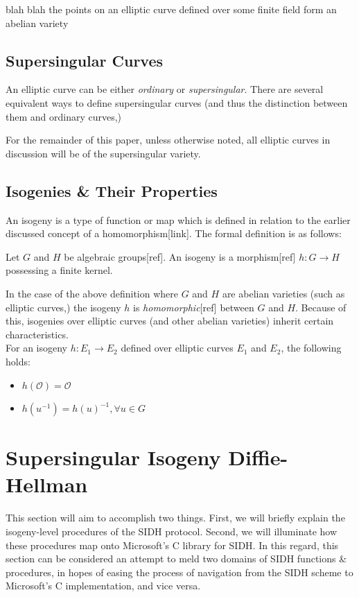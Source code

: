 blah blah the points on an elliptic curve defined over some finite field form an abelian variety

\subsection{Supersingular Curves}

An elliptic curve can be either \emph{ordinary} or \emph{supersingular}. There are several equivalent ways to define supersingular curves (and thus the distinction between them and ordinary curves,)

For the remainder of this paper, unless otherwise noted, all elliptic curves in discussion will be of the supersingular variety.

\subsection{Isogenies \& Their Properties}

An isogeny is a type of function or map which is defined in relation to the earlier discussed concept of a homomorphism[link]. The formal definition is as follows:\\
\begin{definition}[Isogeny]
\label{defn:isogeny}
Let $G$ and $H$ be algebraic groups[ref]. An isogeny is a morphism[ref] $h: G \rightarrow H$ possessing a finite kernel.
\end{definition}
In the case of the above definition where $G$ and $H$ are abelian varieties (such as elliptic curves,) the isogeny $h$ is \emph{homomorphic}[ref] between $G$ and $H$. Because of this, isogenies over elliptic curves (and other abelian varieties) inherit certain characteristics.\\
For an isogeny $h: E_{1} \rightarrow E_{2}$ defined over elliptic curves $E_1$ and $E_2$, the following holds:
\begin{itemize}
\item $h(\mathcal{O}) = \mathcal{O}$
\item $h(u^{-1}) = h(u)^{-1}, \forall u \in G$
\end{itemize}

\section{Supersingular Isogeny Diffie-Hellman}

This section will aim to accomplish two things. First, we will briefly explain the isogeny-level procedures of the SIDH protocol. Second, we will illuminate how these procedures map onto Microsoft's C library for SIDH. In this regard, this section can be considered an attempt to meld two domains of SIDH functions \& procedures, in hopes of easing the process of navigation from the SIDH scheme to Microsoft's C implementation, and vice versa.

